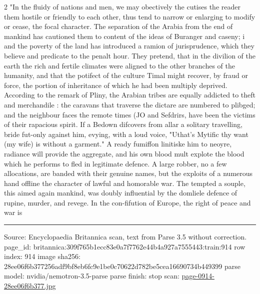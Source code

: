 \documentclass[10pt]{article}
\begin{document}
\begin{multicols}{2}
"In the fluidy of nations and men, we may obectively the cutises the reader them hostile or friendly to each other, thus tend to narrow or enlarging to modify or cease, the focal character. The separation of the Arabia from the end of mankind has cautioned them to content of the ideas of Buranger and caseny; i and the poverty of the land has introduced a ramion of jurisprudence, which they believe and predicate to the penalt hour. They pretend, that in the divilion of the earth the rich and fertile climates were aligned to the other branches of the humanity, and that the potifect of the culture Timal might recover, by fraud or force, the portion of inheritance of which he had been multiply deprived. According to the remark of Pliny, the Arabian tribes are equally addicted to theft and merchandile : the caravans that traverse the dictare are numbered to plibged; and the neighbour faces the remote times (JO and Sefdrirs, have been the victims of their rapacious spirit. If a Bedown difcovers from allar a solitary travelling, bride fut-only against him, evying, with a loud voice, "Uthat's Mytific thy want (my wife) is without a garment." A ready fumiffon linitiske him to neoyre, radiance will provide the aggregate, and his own blood mult explote the blood which he performs to fled in legitimate defence. A large robber, no a few allocations, are banded with their genuine names, but the exploits of a numerous hand offline the character of lawful and homorable war. The tempted a souple, this aimed again mankind, was doubly influential by the domliele defence of rupine, murder, and revege. In the con-fifution of Europe, the right of peace and war is

\end{multicols}
\vfill\par\noindent\rule{\linewidth}{0.4pt}\par
{\scriptsize\color{gray}\noindent Source: Encyclopaedia Britannica scan, text from Parse 3.5 without correction. page\_id: britannica:309f765b1ecc83e0a7f7762e44b4a927a7555443:train:914 \quad row index: 914 \quad image sha256: 28ee06f6b377256adf9bf8eb6fc9e1be0c70622d782be5cea16690734b449399 \quad parse model: nvidia/nemotron-3.5-parse \quad parse finish: stop \quad scan: \href{../scans/page-0914-28ee06f6b377.jpg}{page-0914-28ee06f6b377.jpg}\par}
\end{document}
